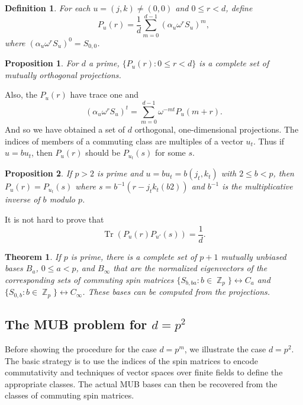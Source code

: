 \documentclass[a4paper]{article}
\DeclareMathOperator{\Z}{\mathbb{Z}}
\DeclareMathOperator{\Tr}{Tr}
\newtheorem{definition}{Definition}
\newtheorem{theorem}{Theorem}
\newtheorem{proposition}{Proposition}
\begin{document}
  \begin{definition}
    For each $u = (j,k) \neq (0,0)$ and $0 \leq r < d$,
    define
    \[
      P_u(r)
      = \frac{1}{d} \sum_{m=0}^{d-1} \left(\alpha_u \omega^{r}
      S_u\right)^{m},
    \] 
    where $(\alpha_u \omega^{r} S_u)^{0} = S_{0,0}$.
  \end{definition}

  \begin{proposition}
    For $d$ a prime, $\{P_u(r) : 0  \leq r < d\}$ is a
    complete set of mutually orthogonal projections.
  \end{proposition}

  Also, the $P_u(r)$ have trace one and
  \[
    (\alpha_u \omega^{r} S_u)^{t}
    = \sum_{m=0}^{d-1} \omega^{-mt} P_u(m+r).
  \] 
  And so we have obtained a set of $d$ orthogonal,
  one-dimensional projections. The indices of members of a
  commuting class are multiples of a vector $u_t$. Thus if
  $u = bu_t$, then $P_u(r)$ should be $P_{u_t}(s)$ for some
  $s$.

  \begin{proposition}
    If $p > 2$ is prime and $u = bu_t = b(j_t,k_t)$ with $2
    \leq b < p$, then $P_u(r) = P_{u_t}(s)$ where $s =
    b^{-1}\left( r - j_t k_t (b 2) \right)$ and
    $b^{-1}$ is the multiplicative inverse of $b$ modulo
    $p$.
  \end{proposition}

  It is not hard to prove that
  \[
    \Tr\left( P_u(r) P_{u'}(s) \right) 
    = \frac{1}{d}.
  \] 

  \begin{theorem}
    If $p$ is prime, there is a complete set of $p+1$ 
    mutually unbiased bases $B_a$, $0 \leq a < p$, and
    $B_\infty$ that are the normalized eigenvectors of the
    corresponding sets of commuting spin matrices
    $\{S_{b,ba} : b \in \Z_p\} \leftrightarrow C_a$ and
    $\{S_{0,b} : b \in \Z_p\} \leftrightarrow C_\infty$.
    These bases can be computed from the projections.
  \end{theorem}

  \subsection{The MUB problem for $d = p^2$}

  Before showing the procedure for the case $d = p^{m}$, we
  illustrate the case $d = p^2$. The basic strategy is to
  use the indices of the spin matrices to encode
  commutativity and techniques of vector spaces over finite
  fields to define the appropriate classes. The actual MUB
  bases can then be recovered from the classes of commuting
  spin matrices.
\end{document}
